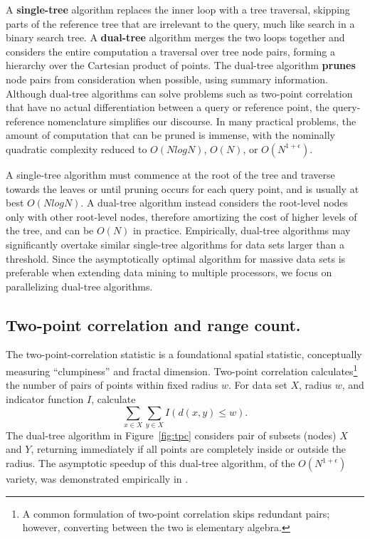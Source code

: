 \documentclass[twoside,leqno,twocolumn]{article}
\newcommand{\fig}[1]{Figure~\ref{fig:#1}}
\newcommand{\mysub}[1]{\subsection{#1.}}
\newcommand{\defterm}[1]{{\bf #1}}
\begin{document}
A \defterm{single-tree} algorithm replaces the inner loop with a tree traversal, skipping parts of the reference tree that are irrelevant to the query, much like search in a binary search tree.
A \defterm{dual-tree} algorithm merges the two loops together and considers the entire computation a traversal over tree node pairs, forming a hierarchy over the Cartesian product of points.
The dual-tree algorithm \defterm{prunes} node pairs from consideration when possible, using summary information.
Although dual-tree algorithms can solve problems such as two-point correlation that have no actual differentiation between a query or reference point, the query-reference nomenclature simplifies our discourse.
In many practical problems, the amount of computation that can be pruned is immense, with the nominally quadratic complexity reduced to $O(N log N)$, $O(N)$, or $O(N^{1+\epsilon})$.

A single-tree algorithm must commence at the root of the tree and traverse towards the leaves or until pruning occurs for each query point, and is usually at best $O(N log N)$.
A dual-tree algorithm instead considers the root-level nodes only with other root-level nodes, therefore amortizing the cost of higher levels of the tree, and can be $O(N)$ in practice.
Empirically, dual-tree algorithms may significantly overtake similar single-tree algorithms for data sets larger than a threshold.
Since the asymptotically optimal algorithm for massive data sets is preferable when extending data mining to multiple processors, we focus on parallelizing dual-tree algorithms.

\mysub{Two-point correlation and range count}
The two-point-correlation statistic is a foundational spatial statistic, conceptually measuring ``clumpiness'' and fractal dimension.
Two-point correlation calculates\footnote{A common formulation of two-point correlation skips redundant pairs; however, converting between the two is elementary algebra.} the number of pairs of points within fixed radius $w$.
For data set $X$, radius $w$, and indicator function $I$, calculate
\[\sum_{x \in X} \sum_{y \in X} I(d(x, y) \leq w).\]
\noindent
The dual-tree algorithm in \fig{tpc} considers pair of subsets (nodes) $X$ and $Y$, returning immediately if all points are completely inside or outside the radius.
The asymptotic speedup of this dual-tree algorithm, of the $O(N^{1+\epsilon})$ variety, was demonstrated empirically in \cite{gray_nbody}.
\end{document}

